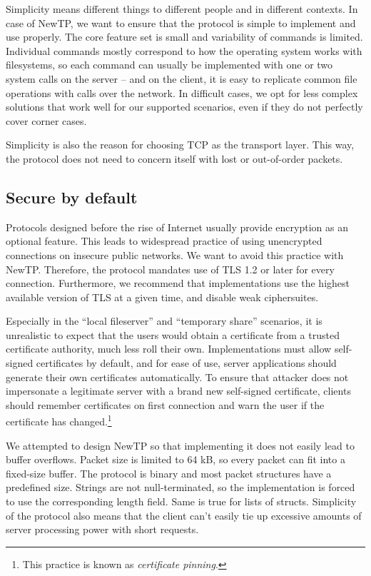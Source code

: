 Simplicity means different things to different people and in different contexts. In case of NewTP, we want to
ensure that the protocol is simple to implement and use properly. The core feature set is small and
variability of commands is limited. Individual commands mostly correspond to how the operating system works
with filesystems, so each command can usually be implemented with one or two system calls on the server -- and
on the client, it is easy to replicate common file operations with calls over the network. In difficult cases,
we opt for less complex solutions that work well for our supported scenarios, even if they do not perfectly
cover corner cases.

Simplicity is also the reason for choosing TCP as the transport layer. This way, the protocol does not need to
concern itself with lost or out-of-order packets.

\subsection{Secure by default}

Protocols designed before the rise of Internet usually provide encryption as an optional feature. This leads
to widespread practice of using unencrypted connections on insecure public networks. We want to avoid this
practice with NewTP. Therefore, the protocol mandates use of TLS 1.2 or later for every connection.
Furthermore, we recommend that implementations use the highest available version of TLS at a given time, and
disable weak ciphersuites.

Especially in the ``local fileserver'' and ``temporary share'' scenarios, it is unrealistic to expect that the
users would obtain a certificate from a trusted certificate authority, much less roll their own.
Implementations must allow self-signed certificates by default, and for ease of use, server applications
should generate their own certificates automatically. To ensure that attacker does not impersonate
a legitimate server with a brand new self-signed certificate, clients should remember certificates on first
connection and warn the user if the certificate has changed.\footnote{This practice is known as {\it
certificate pinning}.}

We attempted to design NewTP so that implementing it does not easily lead to buffer overflows.  Packet size is
limited to 64 kB, so every packet can fit into a fixed-size buffer. The protocol is binary and most packet
structures have a predefined size. Strings are not null-terminated, so the implementation is forced to use the
corresponding length field. Same is true for lists of structs. Simplicity of the protocol also means that the
client can't easily tie up excessive amounts of server processing power with short requests.

